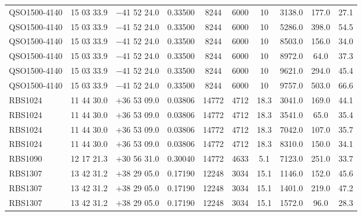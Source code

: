 \begin{landscape}
\begin{center}
\begin{longtable}{l c c c c c c c c c}
QSO1500-4140  &            15 03 33.9  &         $-$41 52 24.0  &       0.33500  & 8244  &    6000  &       10  &        3138.0  &  177.0  &  27.1  \\
QSO1500-4140  &            15 03 33.9  &         $-$41 52 24.0  &       0.33500  & 8244  &    6000  &       10  &        5286.0  &  398.0  &  54.5  \\
QSO1500-4140  &            15 03 33.9  &         $-$41 52 24.0  &       0.33500  & 8244  &    6000  &       10  &        8503.0  &  156.0  &  34.0  \\
QSO1500-4140  &            15 03 33.9  &         $-$41 52 24.0  &       0.33500  & 8244  &    6000  &       10  &        8972.0  &  64.0  &   37.3  \\
QSO1500-4140  &            15 03 33.9  &         $-$41 52 24.0  &       0.33500  & 8244  &    6000  &       10  &        9621.0  &  294.0  &  45.4  \\
QSO1500-4140  &            15 03 33.9  &         $-$41 52 24.0  &       0.33500  & 8244  &    6000  &       10  &        9757.0  &  503.0  &  66.6  \\
RBS1024  &                 11 44 30.0  &         $+$36 53 09.0  &       0.03806  & 14772  &   4712  &       18.3  &      3041.0  &  169.0  &  44.1  \\
RBS1024  &                 11 44 30.0  &         $+$36 53 09.0  &       0.03806  & 14772  &   4712  &       18.3  &      3541.0  &  65.0  &   35.4  \\
RBS1024  &                 11 44 30.0  &         $+$36 53 09.0  &       0.03806  & 14772  &   4712  &       18.3  &      7042.0  &  107.0  &  35.7  \\
RBS1024  &                 11 44 30.0  &         $+$36 53 09.0  &       0.03806  & 14772  &   4712  &       18.3  &      8310.0  &  150.0  &  34.1  \\
RBS1090  &                 12 17 21.3  &         $+$30 56 31.0  &       0.30040  & 14772  &   4633  &       5.1  &       7123.0  &  251.0  &  33.7  \\
RBS1307  &                 13 42 31.2  &         $+$38 29 05.0  &       0.17190  & 12248  &   3034  &       15.1  &      1146.0  &  152.0  &  45.6  \\
RBS1307  &                 13 42 31.2  &         $+$38 29 05.0  &       0.17190  & 12248  &   3034  &       15.1  &      1401.0  &  219.0  &  47.2  \\
RBS1307  &                 13 42 31.2  &         $+$38 29 05.0  &       0.17190  & 12248  &   3034  &       15.1  &      1572.0  &  96.0  &   28.3  \\

\end{longtable}
\end{center}
\end{landscape}
